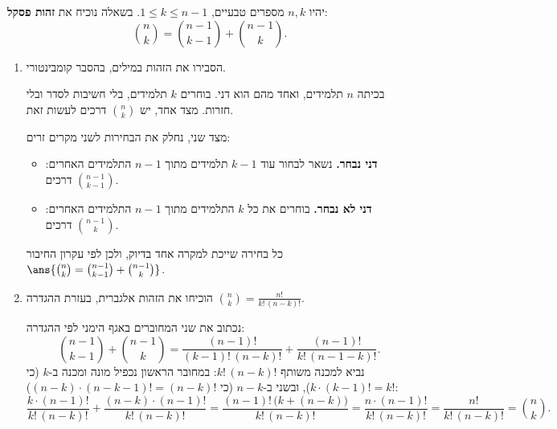 יהיו $n,k$ מספרים טבעיים, $1\le k\le n-1$. בשאלה נוכיח את \textbf{זהות פסקל}:
\[
\binom nk=\binom{n-1}{k-1}+\binom{n-1}k.
\]
\begin{enumerate}
\item הסבירו את הזהות במילים, בהסבר קומבינטורי.
\begin{solbox}
בכיתה $n$ תלמידים, ואחד מהם הוא דני. בוחרים $k$ תלמידים, בלי חשיבות לסדר ובלי חזרות. מצד אחד, יש $\binom nk$ דרכים לעשות זאת.

מצד שני, נחלק את הבחירות לשני מקרים זרים:
\begin{itemize}
\item \textbf{דני נבחר.} נשאר לבחור עוד $k-1$ תלמידים מתוך $n-1$ התלמידים האחרים: $\binom{n-1}{k-1}$ דרכים.
\item \textbf{דני לא נבחר.} בוחרים את כל $k$ התלמידים מתוך $n-1$ התלמידים האחרים: $\binom{n-1}k$ דרכים.
\end{itemize}
כל בחירה שייכת למקרה אחד בדיוק, ולכן לפי עקרון החיבור $\ans{\binom nk=\binom{n-1}{k-1}+\binom{n-1}k}$.
\end{solbox}
\item הוכיחו את הזהות אלגברית, בעזרת ההגדרה $\binom nk=\frac{n!}{k!\,(n-k)!}$.
\begin{solbox}
נכתוב את שני המחוברים באגף הימני לפי ההגדרה:
\[
\binom{n-1}{k-1}+\binom{n-1}k=\frac{(n-1)!}{(k-1)!\,(n-k)!}+\frac{(n-1)!}{k!\,(n-1-k)!}.
\]
נביא למכנה משותף $k!\,(n-k)!$: במחובר הראשון נכפיל מונה ומכנה ב-$k$ (כי $k\cdot(k-1)!=k!$), ובשני ב-$n-k$ (כי $(n-k)\cdot(n-k-1)!=(n-k)!$):
\[
\frac{k\cdot(n-1)!}{k!\,(n-k)!}+\frac{(n-k)\cdot(n-1)!}{k!\,(n-k)!}
=\frac{(n-1)!\,\big(k+(n-k)\big)}{k!\,(n-k)!}
=\frac{n\cdot(n-1)!}{k!\,(n-k)!}
=\frac{n!}{k!\,(n-k)!}=\binom nk.
\]
\end{solbox}
\end{enumerate}
